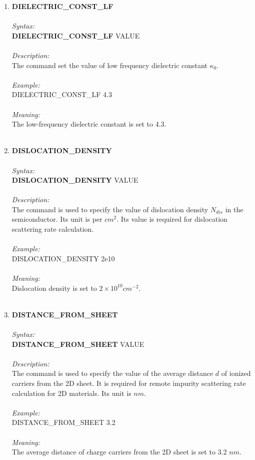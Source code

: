 \documentclass[12pt]{article}
\begin{document}
\begin{enumerate}
    \item \textbf{DIELECTRIC\_CONST\_LF} \\ \\
    \textit{Syntax:} \\
    \textbf{DIELECTRIC\_CONST\_LF} VALUE \\ \\
    \textit{Description:} \\
    The command set the value of low frequency dielectric constant $\kappa_0$. \\ \\
    \textit{Example:} \\
    DIELECTRIC\_CONST\_LF 4.3 \\ \\
    \textit{Meaning:} \\    
    The low-frequency dielectric constant is set to 4.3.\\ \\

    \item \textbf{DISLOCATION\_DENSITY} \\ \\
    \textit{Syntax:} \\
    \textbf{DISLOCATION\_DENSITY} VALUE \\ \\
    \textit{Description:} \\
    The command is used to specify the value of dislocation density $N_{dis}$ in the semiconductor. Its unit is per $cm^2$. Its value is required for dislocation scattering rate calculation.\\ \\
    \textit{Example:} \\
    DISLOCATION\_DENSITY 2e10 \\ \\ 
    \textit{Meaning:} \\    
    Dislocation density is set to $2 \times 10^{10} cm^{-2}$. \\ \\

    \item \textbf{DISTANCE\_FROM\_SHEET} \\ \\
    \textit{Syntax:} \\
    \textbf{DISTANCE\_FROM\_SHEET} VALUE \\ \\
    \textit{Description:} \\
    The command is used to specify the value of the average distance $d$ of ionized carriers from the 2D sheet. It is required for remote impurity scattering rate calculation for 2D materials. Its unit is $nm$. \\ \\
    \textit{Example:} \\
    DISTANCE\_FROM\_SHEET 3.2 \\ \\
    \textit{Meaning:} \\    
    The average distance of charge carriers from the 2D sheet is set to 3.2 $nm$. \\ \\


\end{enumerate}
\end{document}
